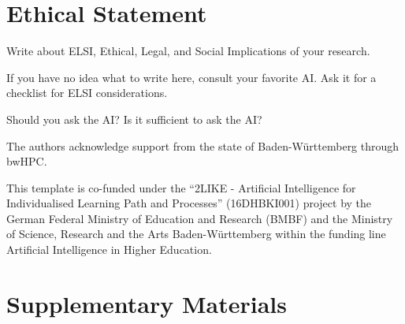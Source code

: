 \documentclass[sigconf, review, nonacm]{acmart}
\begin{document}
\section*{Ethical Statement}

Write about ELSI, \ie Ethical, Legal, and Social Implications of your research.

\begin{tcolorbox}[title=Instructions: How to write an ELSI statement?]
If you have no idea what to write here, consult your favorite AI. Ask it for a checklist for ELSI considerations. 

Should you ask the AI?
Is it sufficient to ask the AI?
\end{tcolorbox}


\begin{acks}

The authors acknowledge support from the state of Baden-Württemberg through bwHPC.

This template is co-funded under the ``2LIKE - Artificial Intelligence for Individualised Learning Path and Processes'' (16DHBKI001)  project by the German Federal Ministry of Education and Research (BMBF) and the Ministry of Science, Research and the Arts Baden-Württemberg within the funding line Artificial Intelligence in Higher Education. 

\mysupervisorrole


\end{acks}





\newpage

\appendix

\section{Supplementary Materials}
\label{appendix:supplementarymaterials}
\end{document}
